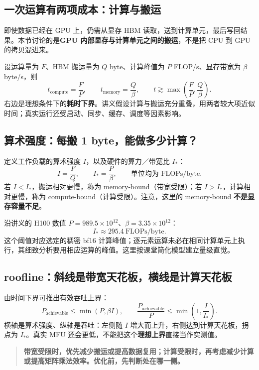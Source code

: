 \documentclass[UTF8,fontset=fandol,zihao=-4,a4paper]{ctexart}
\newcommand{\focus}[1]{\begin{quote}\small\color{accent}\bfseries #1\end{quote}}
\newcommand{\nextpage}{\clearpage}
\begin{document}
\subsection{一次运算有两项成本：计算与搬运}
即使数据已经在 GPU 上，仍需从显存 HBM 读取，送到计算单元，最后写回结果。本节讨论的是\textbf{GPU 内部显存与计算单元之间的搬运}，不是把 CPU 到 GPU 的拷贝混进来。

设运算量为 $F$、HBM 搬运量为 $Q$ byte、计算峰值为 $P$ FLOP/s、显存带宽为 $\beta$ byte/s，则
\[
t_{\text{compute}}=\frac{F}{P},\qquad
t_{\text{memory}}=\frac{Q}{\beta},\qquad
t\gtrsim\max\!\left(\frac{F}{P},\frac{Q}{\beta}\right).
\]
右边是理想条件下的\textbf{耗时下界}。讲义假设计算与搬运充分重叠，用两者较大项近似时间；真实运行还受启动、同步、缓存、调度等因素影响。

\subsection{算术强度：每搬 1 byte，能做多少计算？}
定义工作负载的算术强度 $I$，以及硬件的算力／带宽比 $I_*$：
\[
I=\frac{F}{Q},\qquad I_*=\frac{P}{\beta},\qquad
\text{单位均为 FLOPs/byte}.
\]
若 $I<I_*$，搬运相对更慢，称为 memory-bound（带宽受限）；若 $I>I_*$，计算相对更慢，称为 compute-bound（计算受限）。注意，这里的 memory-bound \textbf{不是显存容量不足}。

沿讲义的 H100 数值 $P=989.5\times10^{12}$、$\beta=3.35\times10^{12}$：
\[
I_*\approx295.4\ \mathrm{FLOPs/byte}.
\]
这个阈值对应选定的稠密 bf16 计算峰值；逐元素运算未必在相同计算单元上执行，其细致分析要用相应运算的峰值。这里按课堂简化模型建立量级直觉。

\subsection{roofline：斜线是带宽天花板，横线是计算天花板}
由时间下界可推出有效吞吐上界：
\[
P_{\text{achievable}}\leq\min(P,\beta I),\qquad
\frac{P_{\text{achievable}}}{P}\leq\min\!\left(1,\frac{I}{I_*}\right).
\]
横轴是算术强度、纵轴是吞吐：左侧随 $I$ 增大而上升，右侧达到计算天花板，拐点为 $I_*$。真实 MFU 还会更低，不能把这个\textbf{理想上界}直接当作实测值。

\focus{带宽受限时，优先减少搬运或提高数据复用；计算受限时，再考虑减少计算或提高矩阵乘法效率。优化前，先判断处在哪一侧。}

\nextpage
\end{document}
